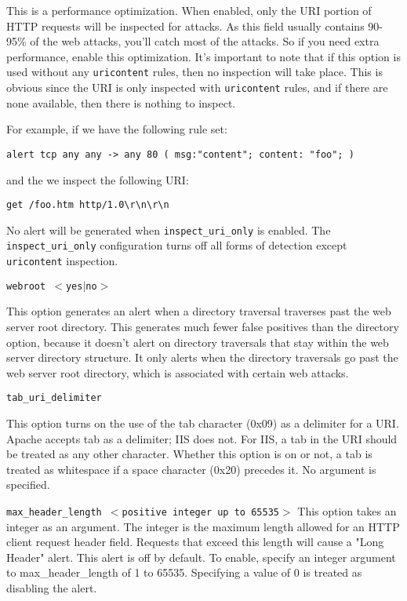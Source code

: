 \documentclass[english]{report}
\newcounter{slistnum}
\newenvironment{slist}
{ \begin{list}{ {\bf \arabic{slistnum}.} }{\usecounter{slistnum} } }
{ \end{list} }
\begin{document}
\begin{slist}
This is a performance optimization.  When enabled, only the URI portion of HTTP
requests will be inspected for attacks.  As this field usually contains 90-95\%
of the web attacks, you'll catch most of the attacks.  So if you need extra
performance, enable this optimization.  It's important to note that if
this option is used without any \texttt{uricontent} rules, then no inspection will take
place.  This is obvious since the URI is only inspected with \texttt{uricontent} rules,
and if there are none available, then there is nothing to inspect.

For example, if we have the following rule set:

\begin{verbatim}
alert tcp any any -> any 80 ( msg:"content"; content: "foo"; )
\end{verbatim}

and the we inspect the following URI:
\begin{verbatim}
get /foo.htm http/1.0\r\n\r\n
\end{verbatim}

No alert will be generated when \texttt{inspect\_uri\_only} is enabled.  The
\texttt{inspect\_uri\_only} configuration turns off all forms of detection except
\texttt{uricontent} inspection.

\item \texttt{webroot $<$yes$|$no$>$}

This option generates an alert when a directory traversal traverses past
the web server root directory.  This generates much fewer false positives than
the directory option, because it doesn't alert on directory traversals that
stay within the web server directory structure.  It only alerts when the
directory traversals go past the web server root directory, which
is associated with certain web attacks.

\item \texttt{tab\_uri\_delimiter}

This option turns on the use of the tab character (0x09) as a delimiter for
a URI.  Apache accepts tab as a delimiter; IIS does not.  For IIS, a tab in
the URI should be treated as any other character.  Whether this option is on
or not, a tab is treated as whitespace if a space character (0x20) precedes it.
No argument is specified.

\item \texttt{max\_header\_length $<$positive integer up to 65535$>$}
This option takes an integer as an argument.  The integer is the maximum length
allowed for an HTTP client request header field.  Requests that exceed this 
length will cause a "Long Header" alert.  This alert is off by default.  To 
enable, specify an integer argument to max\_header\_length of 1 to 65535.  
Specifying a value of 0 is treated as disabling the alert.

\end{slist}
\end{document}
